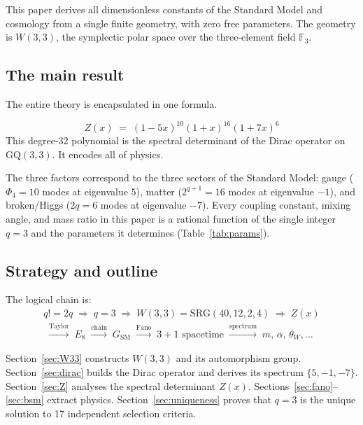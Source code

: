 \documentclass[12pt,a4paper]{article}
\theoremstyle{definition}
\newcommand{\SRG}{\mathrm{SRG}}
\newcommand{\FF}{\mathbb{F}}
\begin{document}
This paper derives all dimensionless constants of the Standard Model
and cosmology from a single finite geometry, with zero free parameters.
The geometry is $W(3,3)$, the symplectic polar space over the three-element
field $\FF_3$.

\subsection{The main result}

The entire theory is encapsulated in one formula.

\begin{tcolorbox}[colback=blue!5!white,colframe=blue!75!black,
  title=\textbf{The One-Line Theory}]
\begin{equation}
  \label{eq:Z_main}
  \boxed{Z(x) \;=\; (1-5x)^{10}(1+x)^{16}(1+7x)^{6}}
\end{equation}
This degree-32 polynomial is the spectral determinant of the Dirac
operator on $\mathrm{GQ}(3,3)$.  It encodes all of physics.
\end{tcolorbox}

\noindent
The three factors correspond to the three sectors of the Standard Model:
gauge ($\Phi_4=10$ modes at eigenvalue $5$), matter ($2^{q+1}=16$ modes
at eigenvalue $-1$), and broken/Higgs ($2q=6$ modes at eigenvalue $-7$).
Every coupling constant, mixing angle, and mass ratio in this paper
is a rational function of the single integer $q=3$ and the parameters
it determines (Table~\ref{tab:params}).

\subsection{Strategy and outline}

The logical chain is:
\begin{multline}
  \label{eq:chain}
  q!=2q \;\Longrightarrow\; q=3
  \;\Longrightarrow\; W(3,3) = \SRG(40,12,2,4)
  \;\Longrightarrow\; Z(x)\\
  \;\xrightarrow{\text{Taylor}}\; E_8
  \;\xrightarrow{\text{chain}}\; G_{\mathrm{SM}}
  \;\xrightarrow{\text{Fano}}\; 3{+}1\text{ spacetime}
  \;\xrightarrow{\text{spectrum}}\; m,\,\alpha,\,\theta_W,\ldots
\end{multline}

Section~\ref{sec:W33} constructs $W(3,3)$ and its automorphism group.
Section~\ref{sec:dirac} builds the Dirac operator and derives
its spectrum $\{5,-1,-7\}$.  Section~\ref{sec:Z} analyses the
spectral determinant $Z(x)$.  Sections~\ref{sec:fano}--\ref{sec:bsm}
extract physics.  Section~\ref{sec:uniqueness} proves that $q=3$ is
the unique solution to 17 independent selection criteria.
\end{document}

